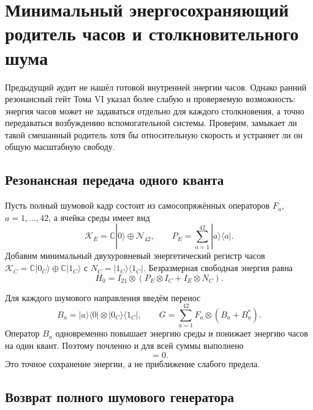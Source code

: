 \chapter{Минимальный энергосохраняющий родитель часов и столкновительного шума}
\label{ch:v8-minimal-mixed-clock-collision-parent-gate}

Предыдущий аудит не нашёл готовой внутренней энергии часов. Однако ранний
резонансный гейт Тома VI указал более слабую и проверяемую возможность:
энергия часов может не задаваться отдельно для каждого столкновения, а
точно передаваться возбуждению вспомогательной системы. Проверим, замыкает
ли такой смешанный родитель хотя бы относительную скорость и устраняет ли
он общую масштабную свободу.

\section{Резонансная передача одного кванта}

Пусть полный шумовой кадр состоит из самосопряжённых операторов
$F_a$, $a=1,\ldots,42$, а ячейка среды имеет вид
\begin{equation}
 \mathcal K_E=\mathbb C|0\rangle\oplus\mathcal N_{42},
 \qquad
 P_E=\sum_{a=1}^{42}|a\rangle\langle a|.
 \label{eq:v8-mixed-parent-environment}
\end{equation}
Добавим минимальный двухуровневый энергетический регистр часов
$\mathcal K_C=\mathbb C|0_C\rangle\oplus\mathbb C|1_C\rangle$ с
$N_C=|1_C\rangle\langle1_C|$. Безразмерная свободная энергия равна
\begin{equation}
 H_0=I_{21}\otimes
 \left(P_E\otimes I_C+I_E\otimes N_C\right).
 \label{eq:v8-mixed-parent-free-energy}
\end{equation}

Для каждого шумового направления введём перенос
\begin{equation}
 B_a=|a\rangle\langle0|\otimes|0_C\rangle\langle1_C|,
 \qquad
 G=\sum_{a=1}^{42}F_a\otimes(B_a+B_a^*).
 \label{eq:v8-mixed-parent-interaction}
\end{equation}
Оператор $B_a$ одновременно повышает энергию среды и понижает энергию
часов на один квант. Поэтому почленно и для всей суммы выполнено
\begin{equation}
 [H_0,G]=0.
 \label{eq:v8-mixed-parent-energy-conservation}
\end{equation}
Это точное сохранение энергии, а не приближение слабого предела.

\section{Возврат полного шумового генератора}

